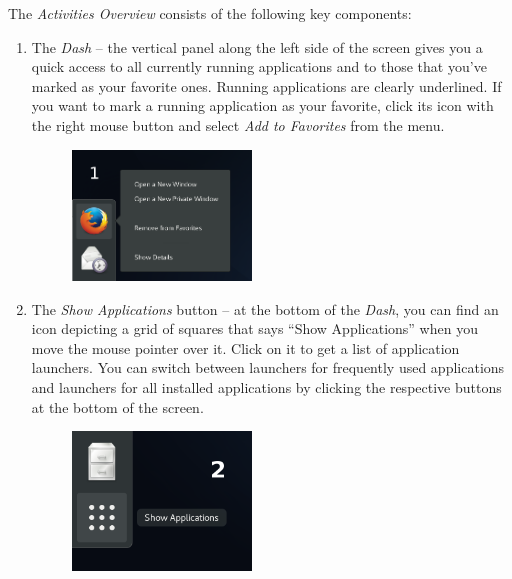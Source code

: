 The \emph{Activities Overview} consists of the following key components:
\begin{enumerate}
\item The \emph{Dash} -- the vertical panel along the left side of the screen gives you a quick access to all currently running applications and to those that you've marked as your favorite ones. Running applications are clearly underlined. If you want to mark a running application as your favorite, click its icon with the right mouse button and select \emph{Add to Favorites} from the menu.

\begin{figure}[ht]
\begin{center}
\includegraphics[width=0.45\textwidth]{img/dash-b}
 \label{fig:dash-b}
\end{center}
\end{figure}

\item The \emph{Show Applications} button -- at the bottom of the \emph{Dash}, you can find an icon depicting a grid of squares that says \enquote{Show Applications} when you move the mouse pointer over it. Click on it to get a list of application launchers. You can switch between launchers for frequently used applications and launchers for all installed applications by clicking the respective buttons at the bottom of the screen.

\begin{figure}[ht]
\begin{center}
\includegraphics[width=0.45\textwidth]{img/dash-a}
 \label{fig:dash-a}
\end{center}
\end{figure}


\end{enumerate}
